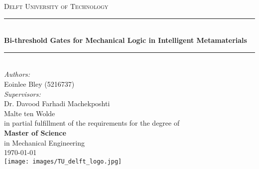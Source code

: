 \documentclass[a4paper]{article}
\begin{document}
\begin{titlepage}

\newcommand{\HRule}{\rule{\linewidth}{0.5mm}} 							%
\center 
 
\textsc{\LARGE Delft University of Technology}\\[1cm]

\HRule \\[0.8cm]
{ \huge \bfseries Bi-threshold Gates for Mechanical Logic in Intelligent Metamaterials }\\[0.7cm]								%
\HRule \\[2cm]
\large
\emph{Authors:}\\
Eoinlee Bley (5216737)\\[1.5cm]	
\emph{Supervisors:}\\
Dr. Davood Farhadi Machekposhti\\
Malte ten Wolde\\[0.5cm]
in partial fulfillment of the requirements for the degree of \\[0.5cm]
\textbf{Master of Science}\\
in Mechanical Engineering\\[0.5cm]
{\large \today}\\[5cm]
\texttt{[image: images/TU\_delft\_logo.jpg]}\\[1cm] 	%
\vfill 
\end{titlepage}

\begin{abstract}

\end{abstract}

\tableofcontents




\newpage



\end{document}
